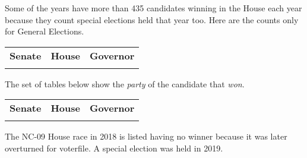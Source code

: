 \documentclass[12pt]{article}
\begin{document}
\begin{itemize}[leftmargin=*]
Some of the years have more than 435 candidates winning in the House each year because they count special elections held that year too. Here are the counts only for General Elections.

\begin{tabularx}{\linewidth}{CCC}
    \textbf{Senate} & \textbf{House} & \textbf{Governor}\\
     &  & 
    \end{tabularx}


The set of tables below show the \emph{party} of the candidate that \emph{won}. 

    \begin{tabularx}{\linewidth}{CCC}
    \textbf{Senate} & \textbf{House} & \textbf{Governor}\\
     &  & 
    \end{tabularx}

The NC-09 House race in 2018 is listed having no winner because it was later overturned for voterfile. A special election was held in 2019.

\end{itemize}
	
\end{document}
